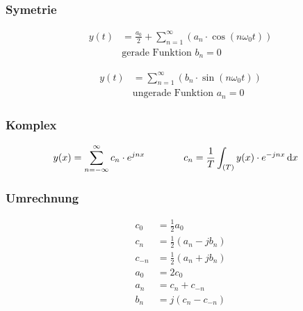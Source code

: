 \subsubsection*{Symetrie}
\begin{multicols}{2}
\begin{align*}
 y(t)&=\frac{a_0}{2}+\sum_{n=1}^\infty\left(a_n\cdot\cos\left(n\omega_0 t\right)\right) \\ &\text{gerade Funktion } b_n = 0
\end{align*}

\begin{align*}
 y(t)&=\sum_{n=1}^\infty\left(b_n\cdot\sin\left(n\omega_0 t\right)\right) \\ &\text{ungerade Funktion } a_n = 0 
\end{align*}
\end{multicols}

\subsubsection*{Komplex}
\begin{alignat*}{2}
y(x)&=\sum_{n=-\infty}^\infty c_n\cdot e^{jnx} &\quad\quad\quad&
c_n=\frac{1}{T}\int_{(T)}y(x)\cdot e^{-jnx}\diff x
\end{alignat*}


\subsubsection*{Umrechnung}

\begin{align*}
c_0&=\frac{1}{2}a_0\\
c_n&=\frac{1}{2}\left(a_n-jb_n\right)\\
c_{-n}&=\frac{1}{2}\left(a_n+jb_n\right)\\
a_0&=2c_0\\
a_n&=c_n+c_{-n}\\
b_n&=j\left(c_n-c_{-n}\right)
\end{align*}

